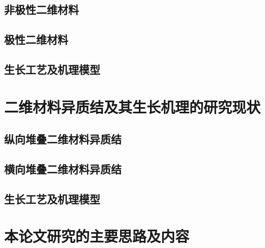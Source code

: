 \subsection{非极性二维材料}
\subsection{极性二维材料}
\subsection{生长工艺及机理模型}

\section{二维材料异质结及其生长机理的研究现状}
\subsection{纵向堆叠二维材料异质结}
\subsection{横向堆叠二维材料异质结}
\subsection{生长工艺及机理模型}

\section{本论文研究的主要思路及内容}